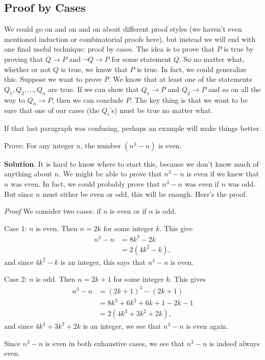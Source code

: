 \documentclass[11pt,]{book}
\makeatletter
\theoremstyle{ptxplainnotitle}
\theoremstyle{ptxplaintitle}
\renewcommand*{\proofname}{Proof}
\renewenvironment{proof}[1][\proofname]{\par
  \pushQED{\qed}%
  \normalfont \topsep6\p@\@plus6\p@\relax
  \trivlist
  \item\relax
    {\itshape
    #1\@addpunct{.}}\hspace\labelsep\ignorespaces
}{%
  \popQED\endtrivlist\@endpefalse
}
\theoremstyle{ptxdefinitionnotitle}
\theoremstyle{ptxdefinitiontitle}
\theoremstyle{ptxdefinitionnotitle}
\theoremstyle{ptxdefinitiontitle}
\theoremstyle{ptxdefinitionnotitle}
\theoremstyle{ptxdefinitiontitle}
\theoremstyle{ptxdefinitiontitlenonumber}
\theoremstyle{ptxdefinitiontitlenonumber}
\numberwithin{equation}{chapter}
\newcommand{\imp}{\rightarrow}
\newcommand{\amp}{&}
\makeatother
\begin{document}
\subsection[{Proof by Cases}]{Proof by Cases}\label{subsection-26}
\hypertarget{p-2447}{}%
%
\par
\hypertarget{p-2448}{}%
We could go on and on and on about different proof styles (we haven't even mentioned induction or combinatorial proofs here), but instead we will end with one final useful technique: proof by cases. The idea is to prove that \(P\) is true by proving that \(Q \imp P\) and \(\neg Q \imp P\) for some statement \(Q\). So no matter what, whether or not \(Q\) is true, we know that \(P\) is true. In fact, we could generalize this. Suppose we want to prove \(P\). We know that at least one of the statements \(Q_1, Q_2, \ldots, Q_n\) are true. If we can show that \(Q_1 \imp P\) and \(Q_2 \imp P\) and so on all the way to \(Q_n \imp P\), then we can conclude \(P\). The key thing is that we want to be sure that one of our cases (the \(Q_i\)'s) must be true no matter what.%
\par
\hypertarget{p-2449}{}%
If that last paragraph was confusing, perhaps an example will make things better.%
\begin{example}\label{example-72}
\hypertarget{p-2450}{}%
Prove: For any integer \(n\), the number \((n^3 -n)\) is even.%
\par\smallskip%
\noindent\textbf{Solution}.\hypertarget{solution-255}{}\quad%
\hypertarget{p-2451}{}%
It is hard to know where to start this, because we don't know much of anything about \(n\). We might be able to prove that \(n^3 - n\) is even if we knew that \(n\) was even. In fact, we could probably prove that \(n^3-n\) was even if \(n\) was odd. But since \(n\) must either be even or odd, this will be enough. Here's the proof.%
\begin{proof}\hypertarget{proof-30}{}
\hypertarget{p-2452}{}%
We consider two cases: if \(n\) is even or if \(n\) is odd.%
\par
\hypertarget{p-2453}{}%
Case 1: \(n\) is even. Then \(n = 2k\) for some integer \(k\). This give%
\begin{align*}
n^3 - n \amp = 8k^3 - 2k\\
\amp = 2(4k^2 - k),
\end{align*}
and since \(4k^2 - k\) is an integer, this says that \(n^3-n\) is even.%
\par
\hypertarget{p-2454}{}%
Case 2: \(n\) is odd. Then \(n = 2k+1\) for some integer \(k\). This gives%
\begin{align*}
n^3 - n \amp = (2k+1)^3 - (2k+1)\\
\amp = 8k^3 + 6k^2 + 6k + 1 - 2k - 1\\
\amp = 2(4k^3 + 3k^2 + 2k),
\end{align*}
and since \(4k^3 + 3k^2 + 2k\) is an integer, we see that \(n^3 - n\) is even again.%
\par
\hypertarget{p-2455}{}%
Since \(n^3 - n\) is even in both exhaustive cases, we see that \(n^3 - n\) is indeed always even.%
\end{proof}
\end{example}
\end{document}
